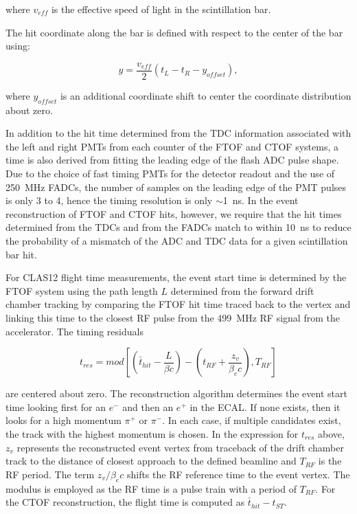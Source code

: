 \documentclass{elsart}
\begin{document}
\noindent
where $v_{eff}$ is the effective speed of light in the scintillation bar.

The hit coordinate along the bar is defined with respect to the center of the bar using:

\begin{equation}
  \label{tof-coor}
  y = \frac{v_{eff}}{2} (t_L - t_R - y_{offset}),
\end{equation}

\noindent
where $y_{offset}$ is an additional coordinate shift to center the coordinate distribution about zero.

In addition to the hit time determined from the TDC information associated with the left and right PMTs
from each counter of the FTOF and CTOF systems, a time is also derived from fitting the leading edge of
the flash ADC pulse shape. Due to the choice of fast timing PMTs for the detector readout and the use of
250~MHz FADCs, the number of samples on the leading edge of the PMT pulses is only 3 to 4, hence
the timing resolution is only $\sim$1~ns. In the event reconstruction of FTOF and CTOF hits, however, we
require that the hit times determined from the TDCs and from the FADCs match to within 10~ns to
reduce the probability of a mismatch of the ADC and TDC data for a given scintillation bar hit.

For CLAS12 flight time measurements, the event start time is determined by the FTOF system using the
path length $L$ determined from the forward drift chamber tracking by comparing the FTOF hit time
traced back to the vertex and linking this time to the closest RF pulse from the 499~MHz RF signal from
the accelerator. The timing residuals

\begin{equation}
  t_{res} = mod \left [ \left (\bar{t}_{hit} - \frac{L}{\beta c} \right) - \left (t_{RF} + \frac{z_v}{\beta_e c} \right),
    T_{RF} \right ]
\end{equation}

\noindent
are centered about zero. The reconstruction algorithm determines the event start time looking first for an
$e^-$ and then an $e^+$ in the ECAL. If none exists, then it looks for a high momentum $\pi^+$ or $\pi^-$. In
each case, if multiple candidates exist, the track with the highest momentum is chosen. In the expression for
$t_{res}$ above, $z_v$ represents the reconstructed event vertex from traceback of the drift chamber track
to the distance of closest approach to the defined beamline and $T_{RF}$ is the RF period. The term
$z_v/\beta_e c$ shifts the RF reference time to the event vertex. The modulus is employed as the RF time is a
pulse train with a period of $T_{RF}$. For the CTOF reconstruction, the flight time is computed as
$\bar{t}_{hit} - t_{ST}$.
\end{document}
